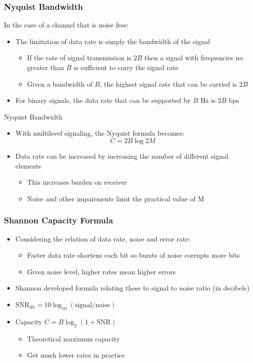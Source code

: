 \documentclass[pdflatex,compress]{beamer}
\begin{document}
\begin{frame}
	\frametitle{Nyquist Bandwidth}
	In the case of a channel that is noise free:
	\begin{itemize}
		\item The limitation of data rate is simply the bandwidth of the signal
		\begin{itemize}
			\item If the rate of signal transmission is $ 2B $ then a signal with frequencies no greater than $ B $ is sufficient to carry the signal rate
			\item Given a bandwidth of $ B $, the highest signal rate that can be carried is $ 2B $
		\end{itemize}
		\item For binary signals, the data rate that can be supported by $ B $ Hz is $ 2B $ bps
	\end{itemize}
\end{frame}

\begin{frame}{Nyquist Bandwidth}
	\begin{itemize}
		\item With multilevel signaling, the Nyquist formula becomes: $$ C = 2B \log 2M $$
		\item Data rate can be increased by increasing the number of different signal elements
		\begin{itemize}
			\item This increases burden on receiver
			\item Noise and other impairments limit the practical value of M
		\end{itemize}
	\end{itemize}
\end{frame}

\begin{frame}
	\frametitle{Shannon Capacity Formula}
	\begin{itemize}
		\item Considering the relation of data rate, noise and error rate:
		\begin{itemize}
			\item  Faster data rate shortens each bit so bursts of noise corrupts more bits
			\item Given noise level, higher rates mean higher errors
		\end{itemize}
		\item Shannon developed formula relating these to signal to noise ratio (in decibels)
		\item $ \text{SNR}_{\text{db}}= 10 \log_{10} (\text{signal}/\text{noise}) $
		\item Capacity $ C = B \log_2(1+\text{SNR}) $
		\begin{itemize}
			\item Theoretical maximum capacity
			\item Get much lower rates in practice
		\end{itemize}
	\end{itemize}
\end{frame}
\end{document}
